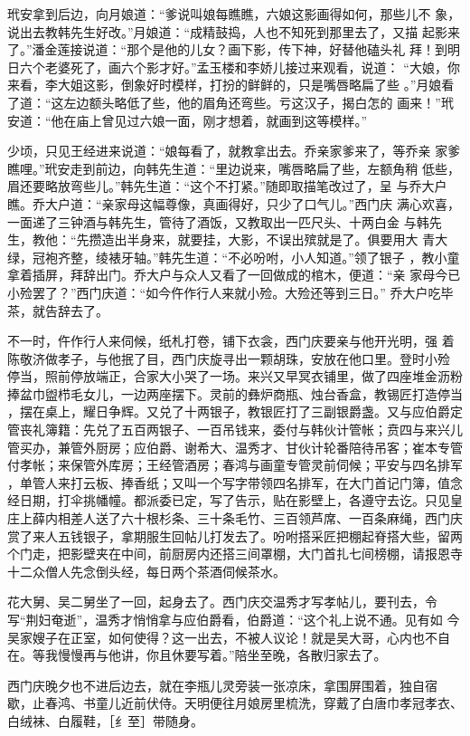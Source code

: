 玳安拿到后边，向月娘道：“爹说叫娘每瞧瞧，六娘这影画得如何，那些儿不
象，说出去教韩先生好改。”月娘道：“成精鼓捣，人也不知死到那里去了，又描
起影来了。”潘金莲接说道：“那个是他的儿女？画下影，传下神，好替他磕头礼
拜！到明日六个老婆死了，画六个影才好。”孟玉楼和李娇儿接过来观看，说道：
“大娘，你来看，李大姐这影，倒象好时模样，打扮的鲜鲜的，只是嘴唇略扁了些
。”月娘看了道：“这左边额头略低了些，他的眉角还弯些。亏这汉子，揭白怎的
画来！”玳安道：“他在庙上曾见过六娘一面，刚才想着，就画到这等模样。”

少顷，只见王经进来说道：“娘每看了，就教拿出去。乔亲家爹来了，等乔亲
家爹瞧哩。”玳安走到前边，向韩先生道：“里边说来，嘴唇略扁了些，左额角稍
低些，眉还要略放弯些儿。”韩先生道：“这个不打紧。”随即取描笔改过了，呈
与乔大户瞧。乔大户道：“亲家母这幅尊像，真画得好，只少了口气儿。”西门庆
满心欢喜，一面递了三钟酒与韩先生，管待了酒饭，又教取出一匹尺头、十两白金
与韩先生，教他：“先攒造出半身来，就要挂，大影，不误出殡就是了。俱要用大
青大绿，冠袍齐整，绫裱牙轴。”韩先生道：“不必吩咐，小人知道。”领了银子
，教小童拿着插屏，拜辞出门。乔大户与众人又看了一回做成的棺木，便道：“亲
家母今已小殓罢了？”西门庆道：“如今仵作行人来就小殓。大殓还等到三日。”
乔大户吃毕茶，就告辞去了。

不一时，仵作行人来伺候，纸札打卷，铺下衣衾，西门庆要亲与他开光明，强
着陈敬济做孝子，与他抿了目，西门庆旋寻出一颗胡珠，安放在他口里。登时小殓
停当，照前停放端正，合家大小哭了一场。来兴又早冥衣铺里，做了四座堆金沥粉
捧盆巾盥栉毛女儿，一边两座摆下。灵前的彝炉商瓶、烛台香盒，教锡匠打造停当
，摆在桌上，耀日争辉。又兑了十两银子，教银匠打了三副银爵盏。又与应伯爵定
管丧礼簿籍：先兑了五百两银子、一百吊钱来，委付与韩伙计管帐；贲四与来兴儿
管买办，兼管外厨房；应伯爵、谢希大、温秀才、甘伙计轮番陪待吊客；崔本专管
付孝帐；来保管外库房；王经管酒房；春鸿与画童专管灵前伺候；平安与四名排军
，单管人来打云板、捧香纸；又叫一个写字带领四名排军，在大门首记门簿，值念
经日期，打伞挑幡幢。都派委已定，写了告示，贴在影壁上，各遵守去讫。只见皇
庄上薛内相差人送了六十根杉条、三十条毛竹、三百领芦席、一百条麻绳，西门庆
赏了来人五钱银子，拿期服生回帖儿打发去了。吩咐搭采匠把棚起脊搭大些，留两
个门走，把影壁夹在中间，前厨房内还搭三间罩棚，大门首扎七间榜棚，请报恩寺
十二众僧人先念倒头经，每日两个茶酒伺候茶水。

花大舅、吴二舅坐了一回，起身去了。西门庆交温秀才写孝帖儿，要刊去，令
写“荆妇奄逝”，温秀才悄悄拿与应伯爵看，伯爵道：“这个礼上说不通。见有如
今吴家嫂子在正室，如何使得？这一出去，不被人议论！就是吴大哥，心内也不自
在。等我慢慢再与他讲，你且休要写着。”陪坐至晚，各散归家去了。

西门庆晚夕也不进后边去，就在李瓶儿灵旁装一张凉床，拿围屏围着，独自宿
歇，止春鸿、书童儿近前伏侍。天明便往月娘房里梳洗，穿戴了白唐巾孝冠孝衣、
白绒袜、白履鞋，［纟至］带随身。

